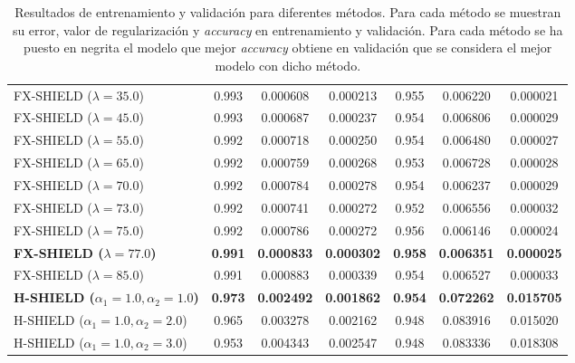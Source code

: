 \begin{table}[htbp]
\begin{tabular}{|l|cccccc|}
\rowcolor{gray!10} FX-SHIELD ($\lambda = 35.0$) & 0.993 & 0.000608 & 0.000213 & 0.955 & 0.006220 & 0.000021 \\
\rowcolor{gray!10} FX-SHIELD ($\lambda = 45.0$) & 0.993 & 0.000687 & 0.000237 & 0.954 & 0.006806 & 0.000029 \\
\rowcolor{gray!10} FX-SHIELD ($\lambda = 55.0$) & 0.992 & 0.000718 & 0.000250 & 0.954 & 0.006480 & 0.000027 \\
\rowcolor{gray!10} FX-SHIELD ($\lambda = 65.0$) & 0.992 & 0.000759 & 0.000268 & 0.953 & 0.006728 & 0.000028 \\
\rowcolor{gray!10} FX-SHIELD ($\lambda = 70.0$) & 0.992 & 0.000784 & 0.000278 & 0.954 & 0.006237 & 0.000029 \\
\rowcolor{gray!10} FX-SHIELD ($\lambda = 73.0$) & 0.992 & 0.000741 & 0.000272 & 0.952 & 0.006556 & 0.000032 \\
\rowcolor{gray!10} FX-SHIELD ($\lambda = 75.0$) & 0.992 & 0.000786 & 0.000272 & 0.956 & 0.006146 & 0.000024 \\
\rowcolor{gray!10} \textbf{FX-SHIELD ($\lambda = 77.0$)} & \textbf{0.991} & \textbf{0.000833} & \textbf{0.000302} & \textbf{0.958} & \textbf{0.006351} & \textbf{0.000025} \\
\rowcolor{gray!10} FX-SHIELD ($\lambda = 85.0$) & 0.991 & 0.000883 & 0.000339 & 0.954 & 0.006527 & 0.000033 \\
\hline
\textbf{H-SHIELD ($\alpha_1=1.0, \alpha_2=1.0$)} & \textbf{0.973} & \textbf{0.002492} & \textbf{0.001862} & \textbf{0.954} & \textbf{0.072262} & \textbf{0.015705} \\
H-SHIELD ($\alpha_1=1.0, \alpha_2=2.0$) & 0.965 & 0.003278 & 0.002162 & 0.948 & 0.083916 & 0.015020 \\
H-SHIELD ($\alpha_1=1.0, \alpha_2=3.0$) & 0.953 & 0.004343 & 0.002547 & 0.948 & 0.083336 & 0.018308 \\
\hline


\end{tabular}
\caption{Resultados de entrenamiento y validación para diferentes métodos. Para cada método se muestran su error, valor de regularización y \textit{accuracy} en entrenamiento y validación. Para cada método se ha puesto en negrita el modelo que mejor \textit{accuracy} obtiene en validación que se considera el mejor modelo con dicho método.}
\label{tab:resultadosTodo}
\end{table}

